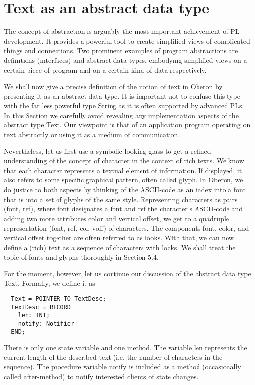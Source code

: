 \section{Text as an abstract data type}
\label{sec:textyp}
The concept of abstraction is arguably the most important achievement of PL development.
It provides a powerful tool to create simplified views of complicated things and
connections. Two prominent examples of program abstractions are definitions (interfaces) and
abstract data types, embodying simplified views on a certain piece of program and on a certain kind
of data respectively.

We shall now give a precise definition of the notion of text in Oberon by presenting it as an abstract
data type. It is important not to confuse this type with the far less powerful type String as it is often
supported by advanced PLs. In this Section we carefully avoid revealing any
implementation aspects of the abstract type Text. Our viewpoint is that of an application program
operating on text abstractly or using it as a medium of communication.

Nevertheless, let us first use a symbolic looking glass to get a refined understanding of the concept
of character in the context of rich texts. We know that each character represents a textual element
of information. If displayed, it also refers to some specific graphical pattern, often called glyph. In
Oberon, we do justice to both aspects by thinking of the ASCII-code as an index into a font that is
into a set of glyphs of the same style. Representing characters as pairs (font, ref), where font
designates a font and ref the character's ASCII-code and adding two more attributes color and
vertical offset, we get to a quadruple representation (font, ref, col, voff) of characters. The
components font, color, and vertical offset together are often referred to as looks. With that, we can
now define a (rich) text as a sequence of characters with looks. We shall treat the topic of fonts and
glyphs thoroughly in Section 5.4.

For the moment, however, let us continue our discussion of the abstract data type Text. Formally,
we define it as
\begin{verbatim}
  Text = POINTER TO TextDesc;
  TextDesc = RECORD
    len: INT;
    notify: Notifier
  END;
\end{verbatim}
There is only one state variable and one method. The variable len represents the current length of
the described text (i.e. the number of characters in the sequence). The procedure variable notify is
included as a method (occasionally called after-method) to notify interested clients of state
changes.

